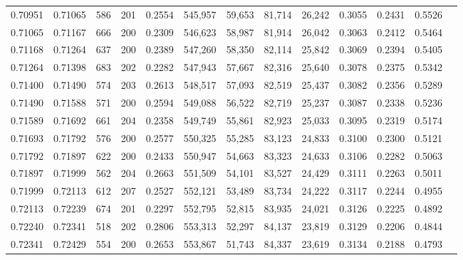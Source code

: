 \begin{tabular}{rrrrrrrrrrrrr}
0.70951 & 0.71065 &   586 & 201 &                                     0.2554 & 545,957 &  59,653 &  81,714 &  26,242 & 0.3055 & 0.2431 & 0.5526 \\
0.71065 & 0.71167 &   666 & 200 &                                     0.2309 & 546,623 &  58,987 &  81,914 &  26,042 & 0.3063 & 0.2412 & 0.5464 \\
0.71168 & 0.71264 &   637 & 200 &                                     0.2389 & 547,260 &  58,350 &  82,114 &  25,842 & 0.3069 & 0.2394 & 0.5405 \\
0.71264 & 0.71398 &   683 & 202 &                                     0.2282 & 547,943 &  57,667 &  82,316 &  25,640 & 0.3078 & 0.2375 & 0.5342 \\
0.71400 & 0.71490 &   574 & 203 &                                     0.2613 & 548,517 &  57,093 &  82,519 &  25,437 & 0.3082 & 0.2356 & 0.5289 \\
0.71490 & 0.71588 &   571 & 200 &                                     0.2594 & 549,088 &  56,522 &  82,719 &  25,237 & 0.3087 & 0.2338 & 0.5236 \\
0.71589 & 0.71692 &   661 & 204 &                                     0.2358 & 549,749 &  55,861 &  82,923 &  25,033 & 0.3095 & 0.2319 & 0.5174 \\
0.71693 & 0.71792 &   576 & 200 &                                     0.2577 & 550,325 &  55,285 &  83,123 &  24,833 & 0.3100 & 0.2300 & 0.5121 \\
0.71792 & 0.71897 &   622 & 200 &                                     0.2433 & 550,947 &  54,663 &  83,323 &  24,633 & 0.3106 & 0.2282 & 0.5063 \\
0.71897 & 0.71999 &   562 & 204 &                                     0.2663 & 551,509 &  54,101 &  83,527 &  24,429 & 0.3111 & 0.2263 & 0.5011 \\
0.71999 & 0.72113 &   612 & 207 &                                     0.2527 & 552,121 &  53,489 &  83,734 &  24,222 & 0.3117 & 0.2244 & 0.4955 \\
0.72113 & 0.72239 &   674 & 201 &                                     0.2297 & 552,795 &  52,815 &  83,935 &  24,021 & 0.3126 & 0.2225 & 0.4892 \\
0.72240 & 0.72341 &   518 & 202 &                                     0.2806 & 553,313 &  52,297 &  84,137 &  23,819 & 0.3129 & 0.2206 & 0.4844 \\
0.72341 & 0.72429 &   554 & 200 &                                     0.2653 & 553,867 &  51,743 &  84,337 &  23,619 & 0.3134 & 0.2188 & 0.4793 \\

\end{tabular}
